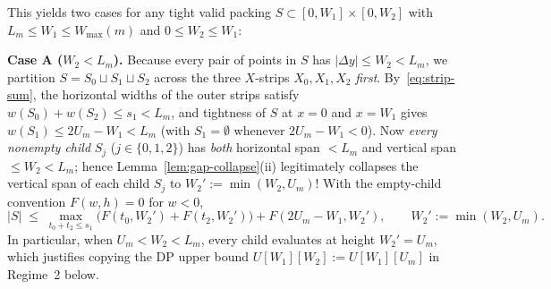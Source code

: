 \documentclass[11pt,reqno]{amsart}
\theoremstyle{plain}
\theoremstyle{definition}
\theoremstyle{remark}
\DeclareRobustCommand{\_}{\ifmmode\text{\textunderscore}\else\textunderscore\allowbreak\fi}
\begin{document}
This yields two cases for any tight valid packing $S \subset [0, W_1] \times [0, W_2]$ with $L_m \le W_1 \le W_{\max}(m)$ and $0 \le W_2 \le W_1$:

\medskip
\noindent\textbf{Case A ($W_2 < L_m$).}
Because every pair of points in $S$ has $|\Delta y| \le W_2 < L_m$, we partition $S = S_0 \sqcup S_1 \sqcup S_2$ across the three $X$-strips $X_0, X_1, X_2$ \emph{first}. By~\eqref{eq:strip-sum}, the horizontal widths of the outer strips satisfy $w(S_0) + w(S_2) \le s_1 < L_m$, and tightness of $S$ at $x = 0$ and $x = W_1$ gives $w(S_1) \le 2 U_m - W_1 < L_m$ (with $S_1 = \emptyset$ whenever $2U_m - W_1 < 0$). Now \emph{every nonempty child} $S_j$ ($j \in \{0, 1, 2\}$) has \emph{both} horizontal span $< L_m$ and vertical span $\le W_2 < L_m$; hence Lemma~\ref{lem:gap-collapse}(ii) legitimately collapses the vertical span of each child $S_j$ to $W_2' := \min(W_2, U_m)$! With the empty-child convention $F(w, h) = 0$ for $w < 0$,
\begin{equation}\label{eq:caseA-rec}
  |S| \;\le\; \max_{t_0 + t_2 \le s_1}\bigl(F(t_0, W_2') + F(t_2, W_2')\bigr) + F(2 U_m - W_1, W_2'), \qquad W_2' := \min(W_2, U_m).
\end{equation}
In particular, when $U_m < W_2 < L_m$, every child evaluates at height $W_2' = U_m$, which justifies copying the DP upper bound $U[W_1][W_2] := U[W_1][U_m]$ in Regime~2 below.
\end{document}
